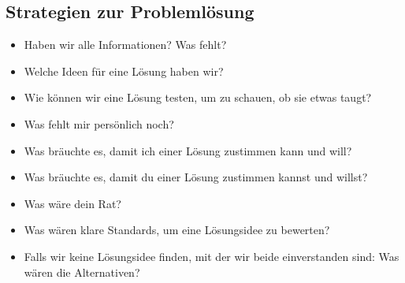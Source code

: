 \subsection{Strategien zur Problemlösung}

\begin{itemize}
    \item Haben wir alle Informationen? Was fehlt?
    \item Welche Ideen für eine Lösung haben wir?
    \item Wie können wir eine Lösung testen, um zu schauen, ob sie etwas taugt?
    \item Was fehlt mir persönlich noch?
    \item Was bräuchte es, damit ich einer Lösung zustimmen kann und will?
    \item Was bräuchte es, damit du einer Lösung zustimmen kannst und willst?
    \item Was wäre dein Rat?
    \item Was wären klare Standards, um eine Lösungsidee zu bewerten?
    \item Falls wir keine Lösungsidee finden, mit der wir beide einverstanden sind: Was wären die Alternativen?
\end{itemize}
